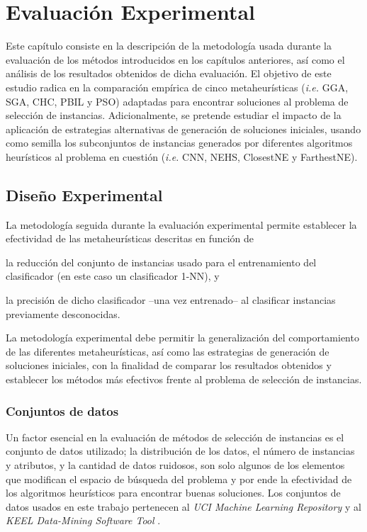 \chapter{Evaluación Experimental}
\label{capitulo4}

Este capítulo consiste en la descripción de la metodología usada durante la evaluación de los métodos introducidos en los capítulos anteriores, así como el análisis de los resultados obtenidos de dicha evaluación. El objetivo de este estudio radica en la comparación empírica de cinco metaheurísticas (\emph{i.e.} GGA, SGA, CHC, PBIL y PSO) adaptadas para encontrar soluciones al problema de selección de instancias. Adicionalmente, se pretende estudiar el impacto de la aplicación de estrategias alternativas de generación de soluciones iniciales, usando como semilla los subconjuntos de instancias generados por diferentes algoritmos heurísticos al problema en cuestión (\emph{i.e.} CNN, NEHS, ClosestNE y FarthestNE).

\section{Diseño Experimental}

La metodología seguida durante la evaluación experimental permite establecer la efectividad de las metaheurísticas descritas en función de
\begin{inparaenum}
\item la reducción del conjunto de instancias usado para el entrenamiento del clasificador (en este caso un clasificador 1-NN), y
\item la precisión de dicho clasificador --una vez entrenado-- al clasificar instancias previamente desconocidas.
\end{inparaenum}
La metodología experimental debe permitir la generalización del comportamiento de las diferentes metaheurísticas, así como las estrategias de generación de soluciones iniciales, con la finalidad de comparar los resultados obtenidos y establecer los métodos más efectivos frente al problema de selección de instancias.

\subsection{Conjuntos de datos}

Un factor esencial en la evaluación de métodos de selección de instancias es el conjunto de datos utilizado; la distribución de los datos, el número de instancias y atributos, y la cantidad de datos ruidosos, son solo algunos de los elementos que modifican el espacio de búsqueda del problema y por ende la efectividad de los algoritmos heurísticos para encontrar buenas soluciones. Los conjuntos de datos usados en este trabajo pertenecen al \emph{UCI Machine Learning Repository} \cite{BacheLichman:2013} y al \emph{KEEL Data-Mining Software Tool} \cite{alcala2010keel}.

